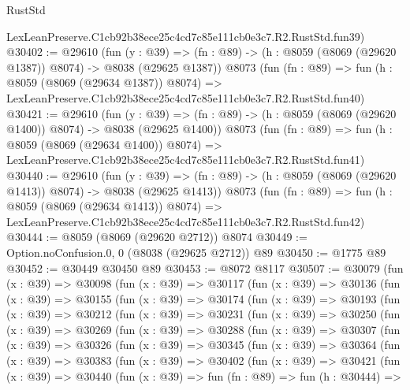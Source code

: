 \begin{lexlean}{RustStd}
\begin{coremodule}
    LexLeanPreserve.C1cb92b38ece25c4cd7c85e111cb0e3c7.R2.RustStd.fun39)
@30402 := @29610
    (fun (y : @39) =>
    (fn : @89) -> (h : @8059 (@8069 (@29620 @1387)) @8074) -> @8038 (@29625 @1387))
    @8073
    (fun (fn : @89) =>
    fun (h : @8059 (@8069 (@29634 @1387)) @8074) =>
    LexLeanPreserve.C1cb92b38ece25c4cd7c85e111cb0e3c7.R2.RustStd.fun40)
@30421 := @29610
    (fun (y : @39) =>
    (fn : @89) -> (h : @8059 (@8069 (@29620 @1400)) @8074) -> @8038 (@29625 @1400))
    @8073
    (fun (fn : @89) =>
    fun (h : @8059 (@8069 (@29634 @1400)) @8074) =>
    LexLeanPreserve.C1cb92b38ece25c4cd7c85e111cb0e3c7.R2.RustStd.fun41)
@30440 := @29610
    (fun (y : @39) =>
    (fn : @89) -> (h : @8059 (@8069 (@29620 @1413)) @8074) -> @8038 (@29625 @1413))
    @8073
    (fun (fn : @89) =>
    fun (h : @8059 (@8069 (@29634 @1413)) @8074) =>
    LexLeanPreserve.C1cb92b38ece25c4cd7c85e111cb0e3c7.R2.RustStd.fun42)
@30444 := @8059 (@8069 (@29620 @2712)) @8074
@30449 := Option.noConfusion.{0, 0} (@8038 (@29625 @2712)) @89
@30450 := @1775 @89
@30452 := @30449 @30450 @89
@30453 := @8072 @8117
@30507 := @30079
    (fun (x : @39) =>
    @30098
      (fun (x : @39) =>
      @30117
        (fun (x : @39) =>
        @30136
          (fun (x : @39) =>
          @30155
            (fun (x : @39) =>
            @30174
              (fun (x : @39) =>
              @30193
                (fun (x : @39) =>
                @30212
                  (fun (x : @39) =>
                  @30231
                    (fun (x : @39) =>
                    @30250
                      (fun (x : @39) =>
                      @30269
                        (fun (x : @39) =>
                        @30288
                          (fun (x : @39) =>
                          @30307
                            (fun (x : @39) =>
                            @30326
                              (fun (x : @39) =>
                              @30345
                                (fun (x : @39) =>
                                @30364
                                  (fun (x : @39) =>
                                  @30383
                                    (fun (x : @39) =>
                                    @30402
                                      (fun (x : @39) =>
                                      @30421
                                        (fun (x : @39) =>
                                        @30440
                                          (fun (x : @39) =>
                                          fun (fn : @89) =>
                                          fun (h : @30444) =>

\end{coremodule}
\end{lexlean}
